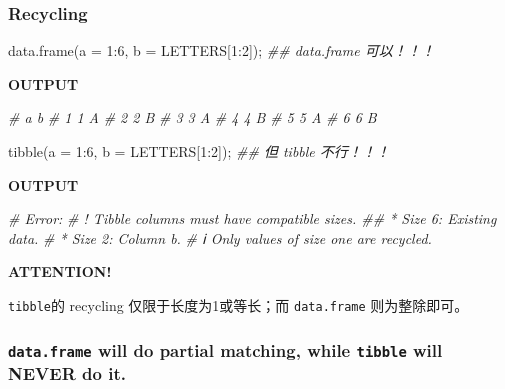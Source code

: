 \documentclass[
]{article}
\newenvironment{Shaded}{}{}
\newcommand{\AttributeTok}[1]{\textcolor[rgb]{0.49,0.56,0.16}{#1}}
\newcommand{\CommentTok}[1]{\textcolor[rgb]{0.38,0.63,0.69}{\textit{#1}}}
\newcommand{\DecValTok}[1]{\textcolor[rgb]{0.25,0.63,0.44}{#1}}
\newcommand{\DocumentationTok}[1]{\textcolor[rgb]{0.73,0.13,0.13}{\textit{#1}}}
\newcommand{\FunctionTok}[1]{\textcolor[rgb]{0.02,0.16,0.49}{#1}}
\newcommand{\NormalTok}[1]{#1}
\newcommand{\SpecialCharTok}[1]{\textcolor[rgb]{0.25,0.44,0.63}{#1}}
\begin{document}
\hypertarget{recycling}{%
\subsubsection{Recycling}\label{recycling}}

\begin{Shaded}
\begin{Highlighting}[]
\FunctionTok{data.frame}\NormalTok{(}\AttributeTok{a =} \DecValTok{1}\SpecialCharTok{:}\DecValTok{6}\NormalTok{, }\AttributeTok{b =}\NormalTok{ LETTERS[}\DecValTok{1}\SpecialCharTok{:}\DecValTok{2}\NormalTok{]); }\DocumentationTok{\#\#  data.frame 可以！！！}
\end{Highlighting}
\end{Shaded}

\textbf{OUTPUT}

\begin{Shaded}
\begin{Highlighting}[]
\CommentTok{\#   a b }
\CommentTok{\# 1 1 A }
\CommentTok{\# 2 2 B }
\CommentTok{\# 3 3 A }
\CommentTok{\# 4 4 B }
\CommentTok{\# 5 5 A }
\CommentTok{\# 6 6 B}
\end{Highlighting}
\end{Shaded}

\begin{Shaded}
\begin{Highlighting}[]
\FunctionTok{tibble}\NormalTok{(}\AttributeTok{a =} \DecValTok{1}\SpecialCharTok{:}\DecValTok{6}\NormalTok{, }\AttributeTok{b =}\NormalTok{ LETTERS[}\DecValTok{1}\SpecialCharTok{:}\DecValTok{2}\NormalTok{]); }\DocumentationTok{\#\# 但 tibble 不行！！！}
\end{Highlighting}
\end{Shaded}

\textbf{OUTPUT}

\begin{Shaded}
\begin{Highlighting}[]
\CommentTok{\# Error:}
\CommentTok{\# ! Tibble columns must have compatible sizes. \#\# * Size 6: Existing data.}
\CommentTok{\# * Size 2: Column \textasciigrave{}b\textasciigrave{}.}
\CommentTok{\# ℹ Only values of size one are recycled.}
\end{Highlighting}
\end{Shaded}

\textbf{ATTENTION!}

\texttt{tibble}的 recycling 仅限于长度为1或等长；而 \texttt{data.frame}
则为整除即可。

\hypertarget{dataframe-will-do-partial-matching-while-tibble-will-never-do-it}{%
\subsubsection{\texorpdfstring{\texttt{data.frame} will do partial
matching, while \texttt{tibble} will \textbf{NEVER} do
it.}{data.frame will do partial matching, while tibble will NEVER do it.}}\label{dataframe-will-do-partial-matching-while-tibble-will-never-do-it}}
\end{document}
